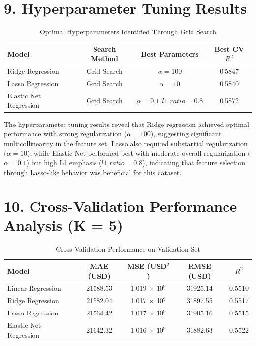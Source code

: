 \documentclass[11pt]{article}
\begin{document}
\section*{9. Hyperparameter Tuning Results}
\begin{table}[H]
\centering
\renewcommand{\arraystretch}{1.3}
\caption{Optimal Hyperparameters Identified Through Grid Search}
\begin{tabular}{|l|c|c|c|}
\hline
Model & Search Method & Best Parameters & Best CV $R^2$ \\ \hline
Ridge Regression & Grid Search & $\alpha=100$ & 0.5847 \\
Lasso Regression & Grid Search & $\alpha=10$ & 0.5840 \\
Elastic Net Regression & Grid Search & $\alpha=0.1, l1\_ratio=0.8$ & 0.5872 \\ \hline
\end{tabular}
\end{table}

The hyperparameter tuning results reveal that Ridge regression achieved optimal performance with strong regularization ($\alpha=100$), suggesting significant multicollinearity in the feature set. Lasso also required substantial regularization ($\alpha=10$), while Elastic Net performed best with moderate overall regularization ($\alpha=0.1$) but high L1 emphasis ($l1\_ratio=0.8$), indicating that feature selection through Lasso-like behavior was beneficial for this dataset.

\section*{10. Cross-Validation Performance Analysis (K = 5)}
\begin{table}[H]
\centering
\renewcommand{\arraystretch}{1.3}
\caption{Cross-Validation Performance on Validation Set}
\begin{tabular}{|l|c|c|c|c|}
\hline
Model & MAE (USD) & MSE (USD$^2$) & RMSE (USD) & $R^2$ \\ \hline
Linear Regression & 21588.53 & 1.019 $\times$ 10$^9$ & 31925.14 & 0.5510 \\
Ridge Regression & 21582.04 & 1.017 $\times$ 10$^9$ & 31897.55 & 0.5517 \\
Lasso Regression & 21564.42 & 1.017 $\times$ 10$^9$ & 31905.16 & 0.5515 \\
Elastic Net Regression & 21642.32 & 1.016 $\times$ 10$^9$ & 31882.63 & 0.5522 \\ \hline
\end{tabular}
\end{table}
\end{document}
